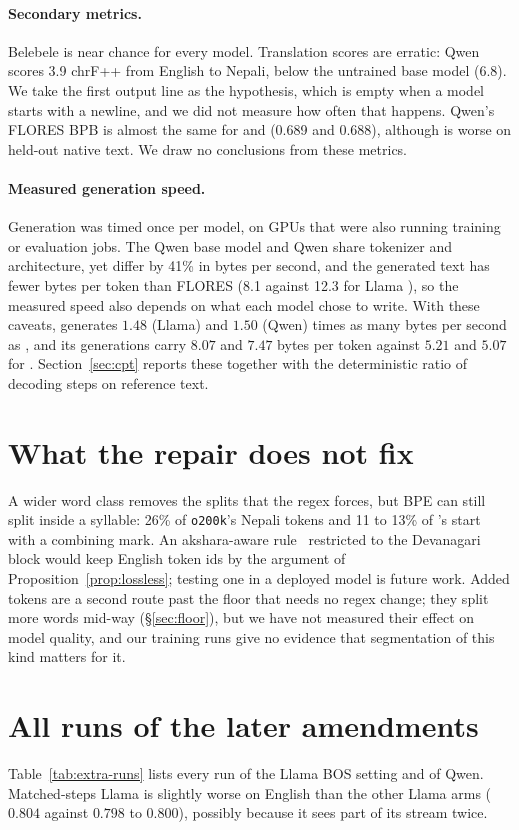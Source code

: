 \paragraph{Secondary metrics.} Belebele is near chance for every model. Translation scores are erratic: Qwen \RII{} scores 3.9 chrF++ from English to Nepali, below the untrained base model (6.8). We take the first output line as the hypothesis, which is empty when a model starts with a newline, and we did not measure how often that happens. Qwen's FLORES BPB is almost the same for \RI{} and \RII{} (0.689 and 0.688), although \RII{} is worse on held-out native text. We draw no conclusions from these metrics.

\paragraph{Measured generation speed.} Generation was timed once per model, on GPUs that were also running training or evaluation jobs. The Qwen base model and Qwen \RO{} share tokenizer and architecture, yet differ by 41\% in bytes per second, and the generated text has fewer bytes per token than FLORES (8.1 against 12.3 for Llama \RII{}), so the measured speed also depends on what each model chose to write. With these caveats, \RII{} generates $1.48$ (Llama) and $1.50$ (Qwen) times as many bytes per second as \RI{}, and its generations carry $8.07$ and $7.47$ bytes per token against $5.21$ and $5.07$ for \RI{}. Section~\ref{sec:cpt} reports these together with the deterministic ratio of decoding steps on reference text.

\section{What the repair does not fix}
\label{app:notfix}
A wider word class removes the splits that the regex forces, but BPE can still split inside a syllable: 26\% of \texttt{o200k}'s Nepali tokens and 11 to 13\% of \RII{}'s start with a combining mark. An akshara-aware rule~\citep{kapila2026typedriven,darshana2026wwho} restricted to the Devanagari block would keep English token ids by the argument of Proposition~\ref{prop:lossless}; testing one in a deployed model is future work. Added tokens are a second route past the floor that needs no regex change; they split more words mid-way (\S\ref{sec:floor}), but we have not measured their effect on model quality, and our training runs give no evidence that segmentation of this kind matters for it.

\section{All runs of the later amendments}
\label{app:extra-runs}
Table~\ref{tab:extra-runs} lists every run of the Llama BOS setting and of Qwen. Matched-steps Llama \RII{} is slightly worse on English than the other Llama arms ($0.804$ against $0.798$ to $0.800$), possibly because it sees part of its stream twice.


